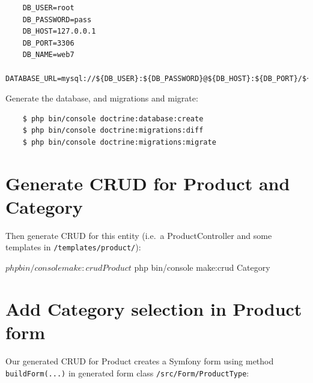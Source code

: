 \documentclass[a4paperpaper,openright]{book}
\newenvironment{Shaded}{}{}
\newcommand{\ExtensionTok}[1]{#1}
\newcommand{\KeywordTok}[1]{\textcolor[rgb]{0.00,0.44,0.13}{\textbf{#1}}}
\newcommand{\NormalTok}[1]{#1}
\newcommand{\OtherTok}[1]{\textcolor[rgb]{0.00,0.44,0.13}{#1}}
\newcommand{\StringTok}[1]{\textcolor[rgb]{0.25,0.44,0.63}{#1}}
\begin{document}
\begin{verbatim}
    DB_USER=root
    DB_PASSWORD=pass
    DB_HOST=127.0.0.1
    DB_PORT=3306
    DB_NAME=web7
    DATABASE_URL=mysql://${DB_USER}:${DB_PASSWORD}@${DB_HOST}:${DB_PORT}/${DB_NAME}
\end{verbatim}

Generate the database, and migrations and migrate:

\begin{verbatim}
    $ php bin/console doctrine:database:create
    $ php bin/console doctrine:migrations:diff
    $ php bin/console doctrine:migrations:migrate
\end{verbatim}

\hypertarget{generate-crud-for-product-and-category}{%
\section{Generate CRUD for Product and
Category}\label{generate-crud-for-product-and-category}}

Then generate CRUD for this entity (i.e.~a ProductController and some
templates in \texttt{/templates/product/}):

\begin{Shaded}
\begin{Highlighting}[]
\NormalTok{    $ }\ExtensionTok{php}\NormalTok{ bin/console make:crud Product}
\NormalTok{    $ }\ExtensionTok{php}\NormalTok{ bin/console make:crud Category}
\end{Highlighting}
\end{Shaded}

\hypertarget{add-category-selection-in-product-form}{%
\section{Add Category selection in Product
form}\label{add-category-selection-in-product-form}}

Our generated CRUD for Product creates a Symfony form using method
\texttt{buildForm(...)} in generated form class
\texttt{/src/Form/ProductType}:

\begin{Shaded}
\end{Shaded}
\end{document}
